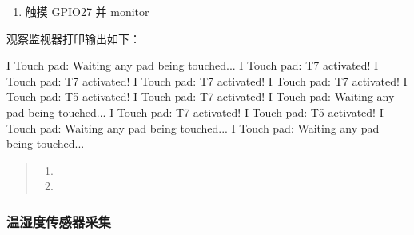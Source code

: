 \documentclass[a4paper,12pt,english]{sphinxmanual}
\begin{document}
{{\begin{enumerate}
\item {} 
\sphinxAtStartPar
触摸 GPIO27 并 monitor

\end{enumerate}

\sphinxAtStartPar
观察监视器打印输出如下：

\begin{sphinxVerbatim}[commandchars=\\\{\}]
I  Touch pad: Waiting  any pad being touched...
I  Touch pad: T7 activated!
I  Touch pad: T7 activated!
I  Touch pad: T7 activated!
I  Touch pad: T7 activated!
I  Touch pad: T5 activated!
I  Touch pad: T7 activated!
I  Touch pad: Waiting  any pad being touched...
I  Touch pad: T7 activated!
I  Touch pad: T5 activated!
I  Touch pad: Waiting  any pad being touched...
I  Touch pad: Waiting  any pad being touched...
\end{sphinxVerbatim}
\begin{quote}

\sphinxAtStartPar
{}
\begin{enumerate}
%
\item {} 
\sphinxAtStartPar
{}

\item {} 
\sphinxAtStartPar
{}

\end{enumerate}
\end{quote}

\sphinxstepscope


\subsubsection{温湿度传感器采集}
\label{\detokenize{exp-esp32/peripherals/dht11:id1}}\label{\detokenize{exp-esp32/peripherals/dht11::doc}}

}}
\end{document}
